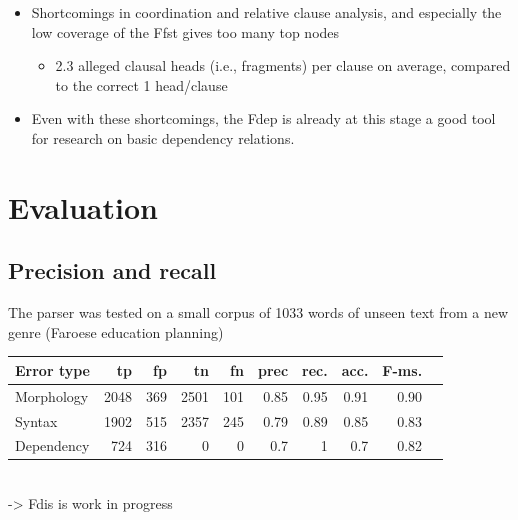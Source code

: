 \documentclass{article}
\begin{document}
\begin{itemize}
\item Shortcomings in coordination and relative clause analysis, and especially the low coverage of the Ffst gives too many top nodes 
\begin{itemize}
\item 2.3 alleged clausal heads (i.e., fragments) per clause on average, compared to the correct 1 head/clause \\ 
\end{itemize}
\item Even with these shortcomings, the Fdep is already at this stage a good tool for research on basic dependency relations.
\end{itemize}\section{Evaluation}
\subsection{Precision and recall}

The parser was tested on a small corpus of 1033 words of unseen text from a new genre (Faroese education planning)

\begin{table}%
\begin{tabular}{|l|r|r|r|r||r|r|r|r|r|}
\hline
Error type	& tp		& fp		& tn		& fn	& prec	 & rec.	& acc.	& F-ms. \\
\hline
Morphology  &  2048  &  369  &  2501  &  101  &  0.85  &  0.95  &  0.91  &  0.90 \\
Syntax  &  1902  &  515  &  2357  &  245  &  0.79  &  0.89  &  0.85  &  0.83 \\
Dependency  &  724  &  316  &  0  &  0  &  0.7  &  1  &  0.7  &  0.82			  \\
\hline
\end{tabular}
\end{table}%

\\ 
-> Fdis is work in progress 
\end{document}
